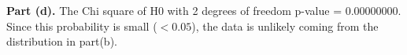 \documentclass[letterpaper,12pt]{article}
\theoremstyle{definition}
\begin{document}
\newpage
\begin{figure}[htb]\centering\captionsetup{width=4.0in}
  \label{Fig1b}
\end{figure}
\begin{figure}[htb]\centering\captionsetup{width=4.0in}
  \label{Fig1c}
\end{figure}

\noindent\textbf{Part (d).}
The Chi square of H0 with 2 degrees of freedom p-value = $0.00000000$. Since this probability is small ($< 0.05$), the data is unlikely coming from the distribution in part(b).\\
\end{document}
